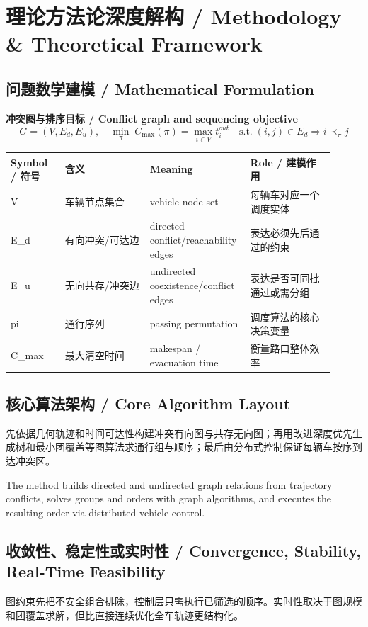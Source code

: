 \documentclass[UTF8,a4paper,11pt,fontset=fandol]{ctexart}
\begin{document}
\section{理论方法论深度解构 / Methodology \& Theoretical Framework}
\subsection{问题数学建模 / Mathematical Formulation}
\textbf{冲突图与排序目标 / Conflict graph and sequencing objective}
\[
G=(V,E_d,E_u),\quad \min_{\pi}\; C_{\max}(\pi)=\max_{i\in V} t_i^{out}\quad \text{s.t.}\; (i,j)\in E_d\Rightarrow i\prec_\pi j
\]
\begin{longtable}{p{0.16\linewidth}p{0.25\linewidth}p{0.25\linewidth}p{0.25\linewidth}}
\toprule
Symbol / 符号 & 含义 & Meaning & Role / 建模作用\\
\midrule
V & 车辆节点集合 & vehicle-node set & 每辆车对应一个调度实体 \\
E\_d & 有向冲突/可达边 & directed conflict/reachability edges & 表达必须先后通过的约束 \\
E\_u & 无向共存/冲突边 & undirected coexistence/conflict edges & 表达是否可同批通过或需分组 \\
pi & 通行序列 & passing permutation & 调度算法的核心决策变量 \\
C\_max & 最大清空时间 & makespan / evacuation time & 衡量路口整体效率 \\
\bottomrule
\end{longtable}

\subsection{核心算法架构 / Core Algorithm Layout}
先依据几何轨迹和时间可达性构建冲突有向图与共存无向图；再用改进深度优先生成树和最小团覆盖等图算法求通行组与顺序；最后由分布式控制保证每辆车按序到达冲突区。

The method builds directed and undirected graph relations from trajectory conflicts, solves groups and orders with graph algorithms, and executes the resulting order via distributed vehicle control.

\subsection{收敛性、稳定性或实时性 / Convergence, Stability, Real-Time Feasibility}
图约束先把不安全组合排除，控制层只需执行已筛选的顺序。实时性取决于图规模和团覆盖求解，但比直接连续优化全车轨迹更结构化。
\end{document}
